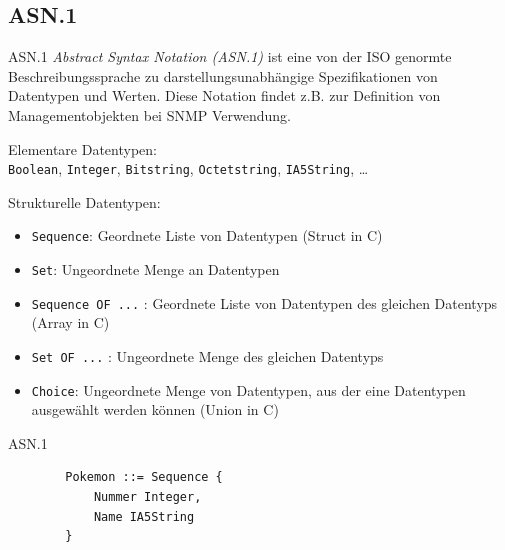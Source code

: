 \subsection{ASN.1}

\begin{defi}{ASN.1}
    \emph{Abstract Syntax Notation (ASN.1)} ist eine von der ISO genormte Beschreibungssprache zu darstellungsunabhängige Spezifikationen von Datentypen und Werten.
    Diese Notation findet z.B. zur Definition von Managementobjekten bei SNMP Verwendung.
    
    Elementare Datentypen:\\
    \texttt{Boolean}, \texttt{Integer}, \texttt{Bitstring}, \texttt{Octetstring}, \texttt{IA5String}, \ldots
    
    Strukturelle Datentypen:
    
    \begin{itemize}
        \item \texttt{Sequence}: Geordnete Liste von Datentypen (Struct in C)
        \item \texttt{Set}: Ungeordnete Menge an Datentypen
        \item \texttt{Sequence OF ...} : Geordnete Liste von Datentypen des gleichen Datentyps (Array in C)
        \item \texttt{Set OF ...} : Ungeordnete Menge des gleichen Datentyps
        \item \texttt{Choice}: Ungeordnete Menge von Datentypen, aus der eine Datentypen ausgewählt werden können (Union in C)
    \end{itemize}
\end{defi}

\begin{example}{ASN.1}
    \begin{lstlisting}
        Pokemon ::= Sequence {
            Nummer Integer,
            Name IA5String
        }
    \end{lstlisting}
\end{example}

